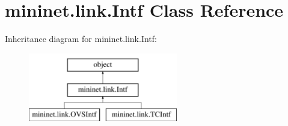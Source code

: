 \hypertarget{classmininet_1_1link_1_1Intf}{\section{mininet.\-link.\-Intf Class Reference}
\label{classmininet_1_1link_1_1Intf}
}
Inheritance diagram for mininet.\-link.\-Intf\-:\begin{figure}[H]
\begin{center}
\leavevmode
\includegraphics[height=3.000000cm]{classmininet_1_1link_1_1Intf}
\end{center}
\end{figure}
